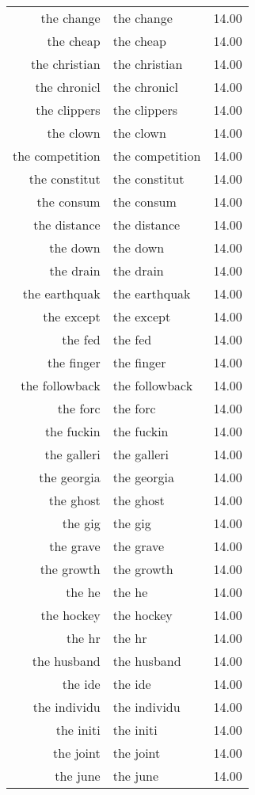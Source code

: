 \begin{table}[ht]
\begin{tabular}{rlr}
  the change & the change & 14.00 \\ 
  the cheap & the cheap & 14.00 \\ 
  the christian & the christian & 14.00 \\ 
  the chronicl & the chronicl & 14.00 \\ 
  the clippers & the clippers & 14.00 \\ 
  the clown & the clown & 14.00 \\ 
  the competition & the competition & 14.00 \\ 
  the constitut & the constitut & 14.00 \\ 
  the consum & the consum & 14.00 \\ 
  the distance & the distance & 14.00 \\ 
  the down & the down & 14.00 \\ 
  the drain & the drain & 14.00 \\ 
  the earthquak & the earthquak & 14.00 \\ 
  the except & the except & 14.00 \\ 
  the fed & the fed & 14.00 \\ 
  the finger & the finger & 14.00 \\ 
  the followback & the followback & 14.00 \\ 
  the forc & the forc & 14.00 \\ 
  the fuckin & the fuckin & 14.00 \\ 
  the galleri & the galleri & 14.00 \\ 
  the georgia & the georgia & 14.00 \\ 
  the ghost & the ghost & 14.00 \\ 
  the gig & the gig & 14.00 \\ 
  the grave & the grave & 14.00 \\ 
  the growth & the growth & 14.00 \\ 
  the he & the he & 14.00 \\ 
  the hockey & the hockey & 14.00 \\ 
  the hr & the hr & 14.00 \\ 
  the husband & the husband & 14.00 \\ 
  the ide & the ide & 14.00 \\ 
  the individu & the individu & 14.00 \\ 
  the initi & the initi & 14.00 \\ 
  the joint & the joint & 14.00 \\ 
  the june & the june & 14.00 \\ 

\end{tabular}
\end{table}
